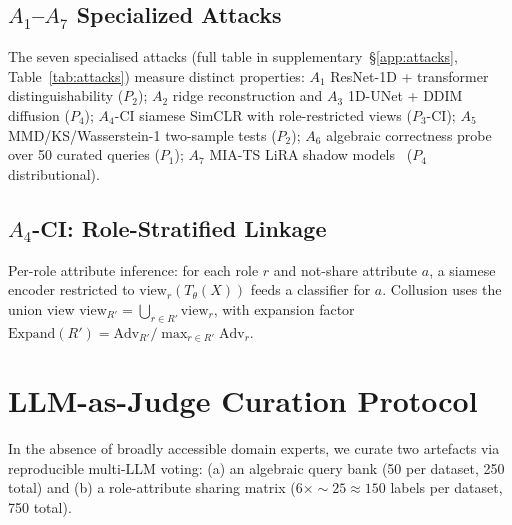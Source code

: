 \documentclass{article}
\theoremstyle{remark}
\newcommand{\Adv}{\mathrm{Adv}}
\newcommand{\view}{\mathrm{view}}
\newcommand{\PCI}{P_3\text{-CI}}
\begin{document}
\subsection{$A_1$--$A_7$ Specialized Attacks}
The seven specialised attacks (full table in supplementary~\S\ref{app:attacks}, Table~\ref{tab:attacks}) measure distinct properties: $A_1$ ResNet-1D + transformer distinguishability ($P_2$); $A_2$ ridge reconstruction and $A_3$ 1D-UNet + DDIM diffusion ($P_4$); $A_4$-CI siamese SimCLR with role-restricted views ($\PCI$); $A_5$ MMD/KS/Wasserstein-1 two-sample tests ($P_2$); $A_6$ algebraic correctness probe over 50 curated queries ($P_1$); $A_7$ MIA-TS LiRA shadow models~\cite{mia_ts} ($P_4$ distributional).

\subsection{$A_4$-CI: Role-Stratified Linkage}
Per-role attribute inference: for each role $r$ and not-share attribute $a$, a siamese encoder restricted to $\view_r(T_\theta(X))$ feeds a classifier for $a$. Collusion uses the union view $\view_{R'} = \bigcup_{r \in R'} \view_r$, with expansion factor $\text{Expand}(R') = \Adv_{R'} / \max_{r \in R'} \Adv_r$.

\section{LLM-as-Judge Curation Protocol}
\label{sec:judge}

In the absence of broadly accessible domain experts, we curate two artefacts via reproducible multi-LLM voting: (a) an algebraic query bank (50 per dataset, 250 total) and (b) a role-attribute sharing matrix ($6 \times {\sim}25 \approx 150$ labels per dataset, 750 total).
\end{document}
